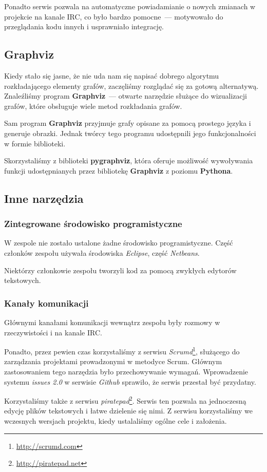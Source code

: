 Ponadto serwis pozwala na automatyczne powiadamianie o nowych zmianach w projekcie na kanale IRC, co było bardzo pomocne~--- motywowało do przeglądania kodu innych i usprawniało integrację.

\subsection{Graphviz}
Kiedy stało się jasne, że nie uda nam się napisać dobrego algorytmu rozkładającego elementy grafów, zaczęliśmy rozglądać się za gotową alternatywą.
Znaleźliśmy program \textbf{Graphviz}~--- otwarte narzędzie służące do wizualizacji grafów, które obsługuje wiele metod rozkładania grafów.

Sam program \textbf{Graphviz} przyjmuje grafy opisane za pomocą prostego języka i generuje obrazki.
Jednak twórcy tego programu udostępnili jego funkcjonalności w formie biblioteki.

Skorzystaliśmy z biblioteki \textbf{pygraphviz}, która oferuje możliwość wywoływania funkcji udostępnianych przez bibliotekę \textbf{Graphviz} z poziomu \textbf{Pythona}.

\subsection{Inne narzędzia}
\subsubsection{Zintegrowane środowisko programistyczne}
W zespole nie zostało ustalone żadne środowisko programistyczne.
Część członków zespołu używała środowiska \emph{Eclipse}, część \emph{Netbeans}.

Niektórzy członkowie zespołu tworzyli kod za pomocą zwykłych edytorów tekstowych.

\subsubsection{Kanały komunikacji}
Głównymi kanałami komunikacji wewnątrz zespołu były rozmowy w rzeczywistości i na kanale IRC.

Ponadto, przez pewien czas korzystaliśmy z serwisu \emph{Scrumd}\footnote{\url{http://scrumd.com}}, służącego do zarządzania projektami prowadzonymi w metodyce Scrum.
Głównym zastosowaniem tego narzędzia było przechowywanie wymagań.
Wprowadzenie systemu \emph{issues 2.0} w serwisie \emph{Github} sprawiło, że serwis przestał być przydatny.

Korzystaliśmy także z serwisu \emph{piratepad}\footnote{\url{http://piratepad.net}}.
Serwis ten pozwala na jednoczesną edycję plików tekstowych i łatwe dzielenie się nimi.
Z serwisu korzystaliśmy we wczesnych wersjach projektu, kiedy ustalaliśmy ogólne cele i założenia.

